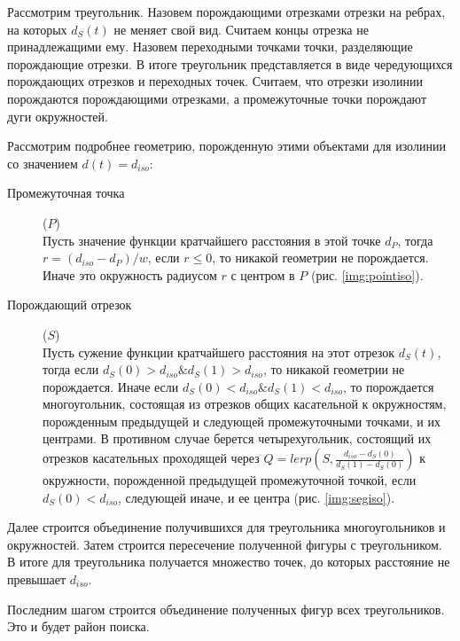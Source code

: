 Рассмотрим треугольник. Назовем порождающими отрезками отрезки на ребрах,
на которых $d_S(t)$ не меняет свой вид. Считаем концы отрезка не
принадлежащими ему. Назовем переходными точками точки,
разделяющие порождающие отрезки. В итоге треугольник представляется в виде
чередующихся порождающих отрезков и переходных точек. Считаем,
что отрезки изолинии порождаются порождающими отрезками, а
промежуточные точки порождают дуги окружностей.

Рассмотрим подробнее геометрию, порожденную этими объектами для
изолинии со значением $d(t) = d_{iso}$:
\begin{description}
\item[Промежуточная точка] ($P$) \\
Пусть значение функции кратчайшего расстояния в этой точке $d_P$, тогда
$r = (d_{iso} - d_P)/w$, если $r \leq 0$, то никакой геометрии не порождается.
Иначе это окружность радиусом $r$ с центром в $P$ (рис. \ref{img:pointiso}).
\item[Порождающий отрезок] ($S$) \\
Пусть сужение функции кратчайшего расстояния на этот отрезок $d_S(t)$, тогда
если $d_S(0) > d_{iso} \& d_S(1) > d_{iso}$, то никакой геометрии не порождается.
Иначе если $d_S(0) < d_{iso} \& d_S(1) < d_{iso}$, то порождается многоугольник,
состоящая из отрезков общих касательной к окружностям, порожденным предыдущей
и следующей промежуточными точками, и их центрами.
В противном случае берется четырехугольник, состоящий их отрезков касательных
проходящей через $Q = lerp(S, \frac{d_{iso}-d_S(0)}{d_S(1) - d_S(0)})$ к
окружности, порожденной предыдущей промежуточной точкой,
если $d_S(0) < d_{iso}$, следующей иначе, и ее центра (рис. \ref{img:segiso}).
\end{description}


Далее строится объединение получившихся для треугольника
многоугольников и окружностей. Затем строится пересечение полученной фигуры
с треугольником. В итоге для треугольника получается множество точек,
до которых расстояние не превышает $d_{iso}$.

Последним шагом строится объединение полученных фигур всех треугольников.
Это и будет район поиска.
